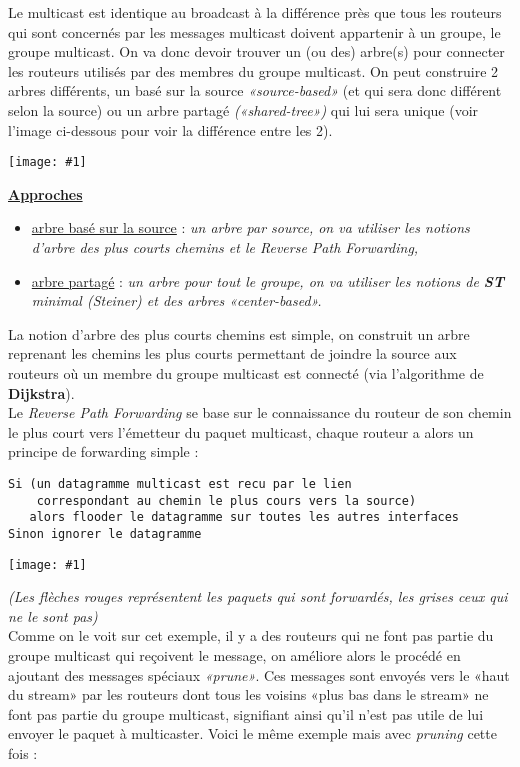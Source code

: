 \documentclass{article}
\newcommand{\ora}[1]{\textcolor{darko}{#1}}
\newcommand{\imgR}[2]{\begin{center}\texttt{[image: \#1]}\end{center}}
\newcommand{\point}[2]{\item \ora{\underline{#1}} : \textit{#2}}
\begin{document}
Le multicast est identique au broadcast à la différence près que tous les routeurs qui sont concernés par les 
messages multicast doivent appartenir à un groupe, le groupe multicast. On va donc devoir trouver un (ou des) 
arbre(s) pour connecter les routeurs utilisés par des membres du groupe multicast. On peut construire 2 
arbres différents, un basé sur la source \textit{«source-based»} (et qui sera donc différent selon la source) ou 
un arbre partagé \textit{(«shared-tree»)} qui lui sera unique (voir l'image ci-dessous pour voir la différence 
entre les 2).

\imgR{CN_099.png}{250}

\noindent\textbf{\underline{Approches}} \\

\noindent\begin{itemize}
\point{arbre basé sur la source}{un arbre par source, on va utiliser les notions d'arbre des plus courts chemins 
et le \textit{Reverse Path Forwarding},}
\point{arbre partagé}{un arbre pour tout le groupe, on va utiliser les notions de \textbf{ST} minimal 
\textit{(Steiner)} et des arbres \textit{«center-based»}.}
\end{itemize}

La notion d'arbre des plus courts chemins est simple, on construit un arbre reprenant les chemins les plus 
courts permettant de joindre la source aux routeurs où un membre du groupe multicast est connecté (via 
l'algorithme de \textbf{Dijkstra}). \\
Le \textit{Reverse Path Forwarding} se base sur le connaissance du routeur de son chemin le plus court vers 
l'émetteur du paquet multicast, chaque routeur a alors un principe de forwarding simple : 
\begin{lstlisting}
Si (un datagramme multicast est recu par le lien
    correspondant au chemin le plus cours vers la source)
   alors flooder le datagramme sur toutes les autres interfaces
Sinon ignorer le datagramme
\end{lstlisting}

\imgR{CN_100.png}{100}

\noindent\textit{(Les flèches rouges représentent les paquets qui sont forwardés, les grises ceux qui ne le sont 
pas)} \\

\noindent Comme on le voit sur cet exemple, il y a des routeurs qui ne font pas partie du groupe multicast qui 
reçoivent le message, on améliore alors le procédé en ajoutant des messages spéciaux \textit{«prune»}. Ces 
messages sont envoyés vers le «haut du stream» par les routeurs dont tous les voisins «plus bas dans le stream» 
ne font pas partie du groupe multicast, signifiant ainsi qu'il n'est pas utile de lui envoyer le paquet à 
multicaster. Voici le même exemple mais avec \textit{pruning} cette fois : 
\end{document}

